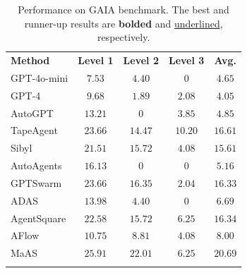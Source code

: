 \documentclass{article}
\theoremstyle{plain}
\theoremstyle{definition}
\theoremstyle{remark}
\newcommand{\ourmethod}{{{MaAS}}\xspace}
\begin{document}
\begin{table}[!t]
\caption{Performance on GAIA benchmark. {The best and runner-up results are \textbf{bolded} and \underline{underlined}, respectively.}}
\label{tab:rq1_gaia}
\renewcommand\tabcolsep{8pt}
\renewcommand\arraystretch{1.1}
\centering
  \footnotesize 
\begin{tabular}{l|cccc} 
    \Xhline{1.2pt}
    \rowcolor{CadetBlue!20} 
    \textbf{Method} & \textbf{Level 1} & \textbf{Level 2} & \textbf{Level 3}& \textbf{Avg.} \\
    \Xhline{1pt}
    GPT-4o-mini  & $7.53$ & $4.40$ & $0$ & $4.65$\\
   \rowcolor{gray!10} GPT-4 & $9.68$ & $1.89$ & $2.08$ & $4.05$ \\
    \hline
    AutoGPT & $13.21$ & $0$ & $3.85$ & $4.85$\\
    \rowcolor{gray!10}TapeAgent & \underline{$23.66$} & $14.47$ & $\mathbf{10.20}$ & $16.61$ \\
   Sibyl & $21.51$ & $15.72$ & $4.08$  & $15.61$\\
    \hline 
    \rowcolor{gray!10}AutoAgents & $16.13$ & $0$ & $0$ & $5.16$  \\
    GPTSwarm & $23.66$ & $16.35$ & $2.04$ &  \underline{$16.33$}\\
    \rowcolor{gray!10}ADAS & $13.98$ & $4.40$ & $0$ & $6.69$ \\
    AgentSquare & $22.58$ & $15.72$ & $6.25$ & \underline{$16.34$} \\
    \rowcolor{gray!10}AFlow & $10.75$ & $8.81$ & $4.08$ & $8.00$  \\
    
    \hline
    \ourmethod  & \textbf{$\mathbf{25.91}$} & \textbf{$\mathbf{22.01}$} & \underline{$6.25$} &  $\mathbf{20.69}$ \\
    \Xhline{1.2pt}
\end{tabular}

  \vspace{-0.9em}

\vspace{-1.em}
\end{table}
\end{document}
